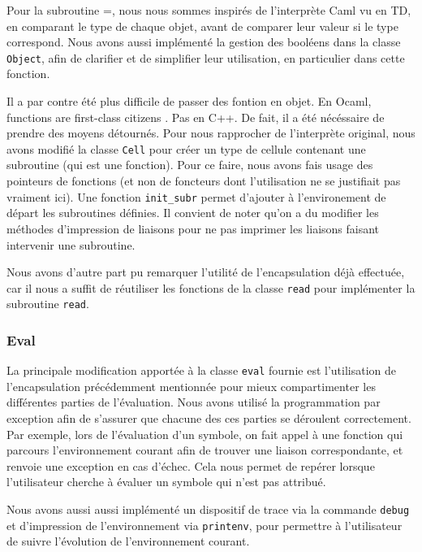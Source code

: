 \documentclass[a4paper,11pt]{article}
\begin{document}
  Pour la subroutine =, nous nous sommes inspirés de l’interprète Caml vu en TD, en 
  comparant le type de chaque objet, avant de comparer leur valeur si le type 
  correspond. Nous avons aussi implémenté la gestion des booléens dans la classe 
  \texttt{Object}, afin de clarifier et de simplifier leur utilisation, en 
  particulier dans cette fonction.

  Il a par contre été plus difficile de passer des fontion en objet. En Ocaml,
  \og functions are first-class citizens \og. Pas en C++. De fait, il a été
  nécéssaire de prendre des moyens détournés.
  Pour nous rapprocher de l'interprète original, nous avons modifié la classe
  \texttt{Cell} pour créer un type de cellule contenant une subroutine (qui est
  une fonction). Pour ce faire, nous avons fais usage des pointeurs de fonctions
  (et non de foncteurs dont l'utilisation ne se justifiait pas vraiment ici).
  Une fonction \texttt{init\_subr} permet d'ajouter à l'environement de départ
  les subroutines définies. Il convient de noter qu'on a du modifier les
  méthodes d'impression de liaisons pour ne pas imprimer les liaisons faisant
  intervenir une subroutine.
  
  Nous avons d'autre part pu remarquer l'utilité de l'encapsulation déjà effectuée, 
  car il nous a suffit de réutiliser les fonctions de la classe \texttt{read} 
  pour implémenter la subroutine \texttt{read}.
  
 \subsubsection{Eval}
 
 La principale modification apportée à la classe \texttt{eval} fournie est 
l'utilisation de l'encapsulation précédemment mentionnée pour mieux compartimenter 
les différentes parties de l'évaluation. Nous avons utilisé la programmation 
par exception afin de s'assurer que chacune des ces parties se déroulent 
correctement. Par exemple, lors de l'évaluation d'un symbole, on fait appel 
à une fonction qui parcours l'environnement courant afin de trouver une liaison 
correspondante, et renvoie une exception en cas d'échec. Cela nous permet de 
repérer lorsque l'utilisateur cherche à évaluer un symbole qui n'est pas attribué.

Nous avons aussi aussi implémenté un dispositif de trace via la commande 
\texttt{debug} et d'impression de l'environnement via \texttt{printenv}, 
pour permettre à l'utilisateur de suivre l'évolution de l'environnement courant.
\end{document}
